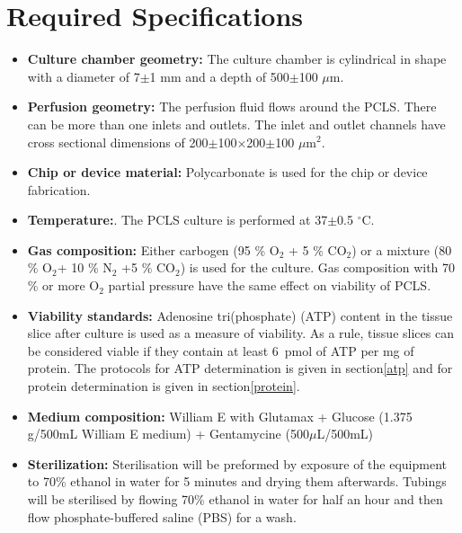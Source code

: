 \documentclass{EU-report}
\begin{document}
\section{Required Specifications}
\begin{itemize}
\item \textbf{Culture chamber geometry:} The culture chamber is cylindrical in
shape with a diameter of 7$\pm$1 mm and a depth of 500$\pm$100 $\mu$m.
\item \textbf{Perfusion geometry:} The perfusion fluid flows around the PCLS.
There can be more than one inlets and outlets. The inlet and outlet channels
have cross sectional dimensions of 200$\pm$100$\times$200$\pm$100 $\mu$m$^2$.
\item \textbf{Chip or device material:} Polycarbonate is used for the chip or
device fabrication.
\item \textbf{Temperature:}. The PCLS culture is performed at
37$\pm$0.5 $^{\circ}$C.
\item \textbf{Gas composition:} Either carbogen (95 \% O$_2$ + 5 \% CO$_2$) or a mixture (80 \% O$_2$+ 10 \% N$_2$ +5 \% CO$_2$) is used
for the culture. Gas composition with 70 \% or more O$_2$ partial pressure have the same effect on viability of PCLS.
\item \textbf{Viability standards:} Adenosine tri(phosphate) (ATP) content in
the tissue slice after culture is used as a measure of viability. As a rule,
tissue slices can be considered viable if they contain at least 6~pmol of ATP
per mg of protein. The protocols for ATP determination is given in section\ref{atp} and for protein determination is given in section\ref{protein}.
\item \textbf{Medium composition:} William E  with Glutamax + Glucose (1.375
g/500mL William E medium) + Gentamycine (500$\mu$L/500mL)
\item \textbf{Sterilization:} Sterilisation will be preformed by exposure of the equipment to 70\% ethanol in water for 5 minutes and drying them afterwards. Tubings will be sterilised by flowing 70\% ethanol in water for half an hour and then flow phosphate-buffered saline (PBS) for a wash.
\end{itemize}
\end{document}

